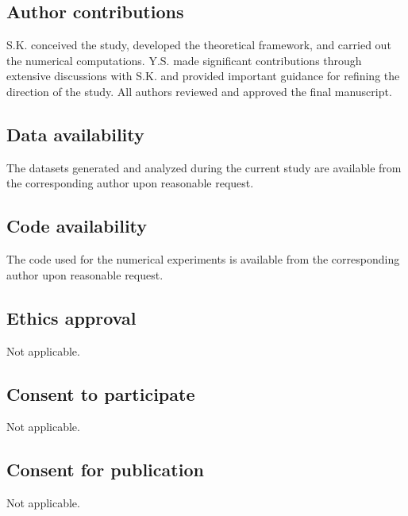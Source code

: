 \documentclass[pdflatex,sn-mathphys-num]{sn-jnl}%
\theoremstyle{thmstyleone}%
\theoremstyle{thmstyletwo}%
\theoremstyle{thmstylethree}%
\begin{document}
\subsection*{Author contributions}
S.K. conceived the study, developed the theoretical framework, and carried out the numerical computations. Y.S. made significant contributions through extensive discussions with S.K. and provided important guidance for refining the direction of the study. All authors reviewed and approved the final manuscript.

\subsection*{Data availability}
The datasets generated and analyzed during the current study are available from the corresponding author upon reasonable request.

\subsection*{Code availability}
The code used for the numerical experiments is available from the corresponding author upon reasonable request.

\subsection*{Ethics approval}
Not applicable.

\subsection*{Consent to participate}
Not applicable.

\subsection*{Consent for publication}
Not applicable.
\end{document}
